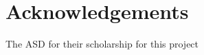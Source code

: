 \chapter*{Acknowledgements}\label{acknowledgements}


The ASD for their scholarship for this project
